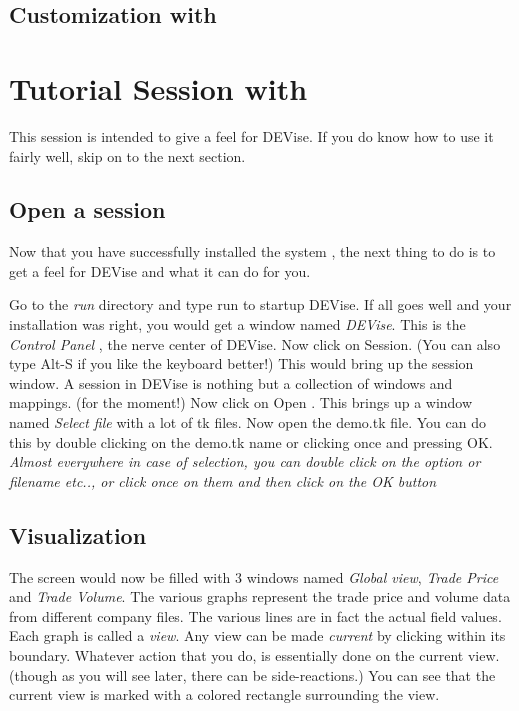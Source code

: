 \subsection{Customization with }


\section{Tutorial Session with \Devise}
{\em
  
  This session is intended to give a feel for DEVise. If you do know how to use it fairly well, skip on to the next section.

}



\subsection{ Open a session}
	

	Now that you have successfully installed the system , the next thing to do is to get a feel for DEVise and what it can do for you.


	Go to the {\em run } directory and type run to startup DEVise. If all goes well and your installation was right, you would get a window named {\em DEVise}. This is the {\em Control Panel }, the nerve center of DEVise. Now click on Session. (You can also type Alt-S if you like the keyboard better!) This would bring up the session window. A session in DEVise is nothing but a collection of windows and mappings. (for the moment!) Now click on Open . This brings up a window named {\em Select file } with a lot of tk files. Now open the demo.tk file. You can do this by double clicking on the demo.tk name or clicking once and pressing OK. {\em Almost everywhere in case of selection, you can double click on the option or filename etc.., or click once on them and then click on the OK button }

\subsection{ Visualization }


	The screen would now be filled with  3 windows named {\em Global view}, {\em Trade Price} and {\em Trade Volume}. The various graphs represent the trade price and volume data from different company files. The various lines are in fact the actual field values. Each graph is called a {\em view}. Any view can be made {\em current } by clicking within its boundary. Whatever action that you do, is essentially done on the current view.(though as you will see later, there can be side-reactions.) You can see that the current view is marked with a colored rectangle surrounding the view.


